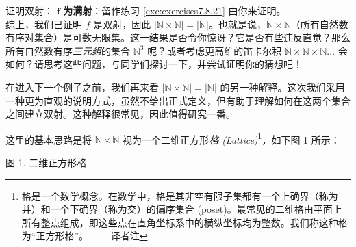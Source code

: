 \begin{example}
\begin{proofs}{证明双射：}
        $\mathbf{f}$ \textbf{为满射}：留作练习 \ref{exc:exercises7.8.21} 由你来证明。\\

        综上，我们已证明 $f$ 是双射，因此 $|\mathbb{N} \times \mathbb{N}| = |\mathbb{N}|$。也就是说，$\mathbb{N} \times \mathbb{N}$（所有自然数有序对集合）是可数无限集。这一结果是否令你惊讶？它是否有些违反直觉？那么所有自然数有序\emph{三元组}的集合 $\mathbb{N}^3$ 呢？或者考虑更高维的笛卡尔积 $\mathbb{N} \times \mathbb{N} \times \mathbb{N} \dots$ 会如何？请思考这些问题，与同学们探讨一下，并尝试证明你的猜想吧！
    \end{proofs}
\end{example}

\begin{example}\label{ex:example7.6.14}

    在进入下一个例子之前，我们再来看 $|\mathbb{N} \times \mathbb{N}| = |\mathbb{N}|$ 的另一种解释。这次我们采用一种更为直观的说明方式，虽然不给出正式定义，但有助于理解如何在这两个集合之间建立双射。这种解释很常见，因此值得研究一番。

    这里的基本思路是将 $\mathbb{N} \times \mathbb{N}$ 视为一个二维正方形\emph{格 (Lattice)}\footnote{格是一个数学概念。在数学中，格是其非空有限子集都有一个上确界（称为并）和一个下确界（称为交）的偏序集合 (poset)。最常见的二维格由平面上所有整点组成，即这些点在直角坐标系中的横纵坐标均为整数。我们称这种格为``正方形格''。—— 译者注}，如下图 1 所示：

    \begin{multicols}{2}
    \begin{center}

        \small 图 1. 二维正方形格
    \end{center}

    \begin{center}
\end{center}
\end{multicols}
\end{example}
